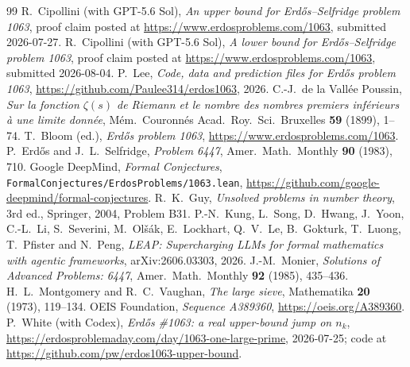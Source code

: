 \documentclass[11pt]{amsart}
\theoremstyle{remark}
\begin{document}
\begin{thebibliography}{99}
 R.~Cipollini (with GPT-5.6 Sol), \emph{An upper bound for Erd\H{o}s--Selfridge problem 1063}, proof claim posted at \url{https://www.erdosproblems.com/1063}, submitted 2026-07-27.
 R.~Cipollini (with GPT-5.6 Sol), \emph{A lower bound for Erd\H{o}s--Selfridge problem 1063}, proof claim posted at \url{https://www.erdosproblems.com/1063}, submitted 2026-08-04.
 P.~Lee, \emph{Code, data and prediction files for Erd\H{o}s problem 1063}, \url{https://github.com/Paulee314/erdos1063}, 2026.
 C.-J.~de la Vall\'ee Poussin, \emph{Sur la fonction $\zeta(s)$ de Riemann et le nombre des nombres premiers inf\'erieurs \`a une limite donn\'ee}, M\'em.\ Couronn\'es Acad.\ Roy.\ Sci.\ Bruxelles \textbf{59} (1899), 1--74.
 T.~Bloom (ed.), \emph{Erd\H{o}s problem 1063}, \url{https://www.erdosproblems.com/1063}.
 P.~Erd\H{o}s and J.~L.~Selfridge, \emph{Problem 6447}, Amer.\ Math.\ Monthly \textbf{90} (1983), 710.
 Google DeepMind, \emph{Formal Conjectures}, \texttt{FormalConjectures/ErdosProblems/1063.lean}, \url{https://github.com/google-deepmind/formal-conjectures}.
 R.~K.~Guy, \emph{Unsolved problems in number theory}, 3rd ed., Springer, 2004, Problem B31.
 P.-N.~Kung, L.~Song, D.~Hwang, J.~Yoon, C.-L.~Li, S.~Severini, M.~Ol\v{s}\'ak, E.~Lockhart, Q.~V.~Le, B.~Gokturk, T.~Luong, T.~Pfister and N.~Peng, \emph{LEAP: Supercharging LLMs for formal mathematics with agentic frameworks}, arXiv:2606.03303, 2026.
 J.-M.~Monier, \emph{Solutions of Advanced Problems: 6447}, Amer.\ Math.\ Monthly \textbf{92} (1985), 435--436.
 H.~L.~Montgomery and R.~C.~Vaughan, \emph{The large sieve}, Mathematika \textbf{20} (1973), 119--134.
 OEIS Foundation, \emph{Sequence A389360}, \url{https://oeis.org/A389360}.
 P.~White (with Codex), \emph{Erd\H{o}s \#1063: a real upper-bound jump on $n_k$}, \url{https://erdosproblemaday.com/day/1063-one-large-prime}, 2026-07-25; code at \url{https://github.com/pw/erdos1063-upper-bound}.
\end{thebibliography}
\end{document}
